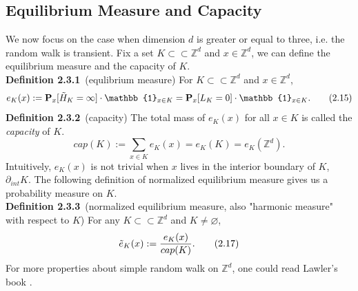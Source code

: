 \documentclass[
11pt, %
a4paper, %
oneside, %
headinclude,footinclude, %
BCOR5mm, %
]{scrartcl}
\begin{document}
\subsection{Equilibrium Measure and Capacity}
We now focus on the case when dimension $d$ is greater or equal to three, i.e. the random walk is transient. Fix a set $K \subset\subset \mathbb{Z}^d$ and $x \in \mathbb{Z}^d$, we can define the equilibrium measure and the capacity of $K$.
\vspace{0.6em}\\\textbf{Definition 2.3.1}\ (equlibrium measure) For $K \subset\subset \mathbb{Z}^d$ and $x \in \mathbb{Z}^d$, 
\begin{equation}
    e_K(x):=\mathbf{P}_x[\Tilde{H}_K=\infty]\cdot \mathbb{1}_{x \in K}=\mathbf{P}_x[L_K=0]\cdot \mathbb{1}_{x \in K}. \tag{2.15}
\end{equation}
\textbf{Definition 2.3.2}\ (capacity) The total mass of $e_K(x)$ for all $x \in K$ is called the \textit{capacity} of $K$.
\begin{equation}
    cap(K):=\sum_{x \in K} e_K(x)=e_K(K)=e_K(\mathbb{Z}^d). \tag{2.16}
\end{equation}    
Intuitively, $e_K(x)$ is not trivial when $x$ lives in the interior boundary of $K$, $\partial_{int} K$. The following definition of normalized equilibrium measure gives us a probability measure on $K$.
\vspace{0.6em}\\\textbf{Definition 2.3.3}\ (normalized equilibrium measure, also "harmonic measure" with respect to $K$) For any $K \subset\subset \mathbb{Z}^d$ and $K \neq \varnothing$, 
\begin{equation}
    \label{eq3.11}
    \Tilde{e}_K(x):=\frac{e_K(x)}{cap(K)}. \tag{2.17} 
\end{equation}   
For more properties about simple random walk on $\mathbb{Z}^d$, one could read Lawler's book \cite{lawler2013intersections}.
\end{document}
